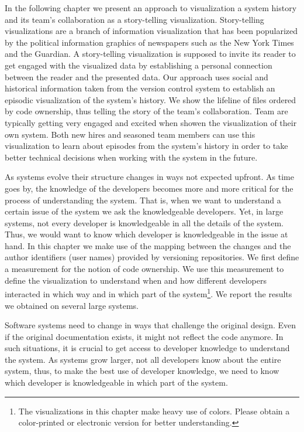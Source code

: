 In the following chapter we present an approach to visualization a system history and its team's collaboration as a story-telling visualization. Story-telling visualizations are a branch of information visualization that has been popularized by the political information graphics of newspapers such as the New York Times and the Guardian. A story-telling visualization is supposed to invite its reader to get engaged with the visualized data by establishing a personal connection between the reader and the presented data. Our approach uses social and historical information taken from the version control system to establish an episodic visualization of the system's history. We show the lifeline of files ordered by code ownership, thus telling the story of the team's collaboration. Team are typically getting very engaged and excited when showen the visualization of their own system. Both new hires and seasoned team members can use this visualization to learn about episodes from the system's history in order to take better technical decisions when working with the system in the future.

\asteriskasteriskasterisk

As systems evolve their structure changes in ways not expected upfront. As time goes by, the knowledge of the developers becomes more and more critical for the process of understanding the system. That is, when we want to understand a certain issue of the system we ask the knowledgeable developers. Yet, in large systems, not every developer is knowledgeable in all the details of the system. Thus, we would want to know which developer is knowledgeable in the issue at hand. In this chapter we make use of the mapping between the changes and the author identifiers (\eg user names) provided by versioning repositories. We first define a measurement for the notion of code ownership. We use this measurement to define the \omap visualization to understand when and how different developers interacted in which way and in which part of the system\footnote{The visualizations in this chapter make heavy use of colors. Please obtain a color-printed or electronic version for better understanding.}. We report the results we obtained on several large systems.

Software systems need to change in ways that challenge the original design. Even if the original documentation exists, it might not reflect the code anymore. In such situations, it is crucial to get access to developer knowledge to understand the system. As systems grow larger, not all developers know about the entire system, thus, to make the best use of developer knowledge, we need to know which developer is knowledgeable in which part of the system.

